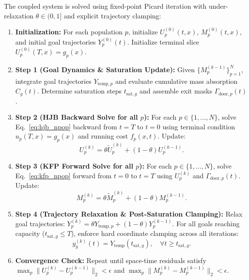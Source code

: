 \documentclass[11pt,a4paper]{article}
\begin{document}
The coupled system is solved using fixed-point Picard iteration with under-relaxation $\theta \in (0, 1]$ and explicit trajectory clamping:
\begin{enumerate}
    \item \textbf{Initialization:} For each population $p$, initialize $U_p^{(0)}(t, x)$, $M_p^{(0)}(t, x)$, and initial goal trajectories $Y_p^{(0)}(t)$. Initialize terminal slice $U_p^{(0)}(T, x) = g_p(x)$.
    \item \textbf{Step 1 (Goal Dynamics \& Saturation Update):} Given $\{M_p^{(k-1)}\}_{p=1}^N$, integrate goal trajectories $Y_{\text{temp}, p}$ and evaluate cumulative mass absorption $C_g(t)$. Determine saturation steps $t_{\text{sat}, g}$ and assemble exit masks $\Gamma_{\text{door}, p}(t)$.
    \item \textbf{Step 2 (HJB Backward Solve for all $p$):} For each $p \in \{1, \dots, N\}$, solve Eq.~\eqref{eq:hjb_npop} backward from $t = T$ to $t = 0$ using terminal condition $u_p(T, x) = g_p(x)$ and running cost $f_p(x, t)$. Update:
    \begin{equation}
    U_p^{(k)} = \theta \tilde{U}_p^{(k)} + (1 - \theta) U_p^{(k-1)}.
    \end{equation}
    \item \textbf{Step 3 (KFP Forward Solve for all $p$):} For each $p \in \{1, \dots, N\}$, solve Eq.~\eqref{eq:kfp_npop} forward from $t = 0$ to $t = T$ using $U_p^{(k)}$ and $\Gamma_{\text{door}, p}(t)$. Update:
    \begin{equation}
    M_p^{(k)} = \theta \tilde{M}_p^{(k)} + (1 - \theta) M_p^{(k-1)}.
    \end{equation}
    \item \textbf{Step 4 (Trajectory Relaxation \& Post-Saturation Clamping):} Relax goal trajectories: $Y_p^{(k)} = \theta Y_{\text{temp}, p} + (1-\theta) Y_p^{(k-1)}$. For all goals reaching capacity ($t_{\text{sat}, g} \le T$), enforce hard coordinate clamping across all iterations:
    \begin{equation}
    y_g^{(k)}(t) = Y_{\text{temp}}(t_{\text{sat}, g}), \quad \forall t \ge t_{\text{sat}, g}.
    \end{equation}
    \item \textbf{Convergence Check:} Repeat until space-time residuals satisfy $\max_p \|U_p^{(k)} - U_p^{(k-1)}\|_2 < \epsilon$ and $\max_p \|M_p^{(k)} - M_p^{(k-1)}\|_2 < \epsilon$.
\end{enumerate}
\end{document}
